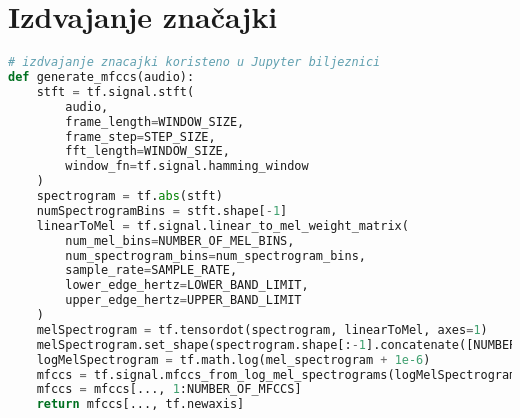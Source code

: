 \chapter{Izdvajanje značajki}
\label{add:mfcc}

\begin{lstlisting}[language=Python]
# izdvajanje znacajki koristeno u Jupyter biljeznici
def generate_mfccs(audio):
    stft = tf.signal.stft(
        audio,
        frame_length=WINDOW_SIZE,
        frame_step=STEP_SIZE,
        fft_length=WINDOW_SIZE,
        window_fn=tf.signal.hamming_window
    )
    spectrogram = tf.abs(stft)
    numSpectrogramBins = stft.shape[-1]
    linearToMel = tf.signal.linear_to_mel_weight_matrix(
        num_mel_bins=NUMBER_OF_MEL_BINS,
        num_spectrogram_bins=num_spectrogram_bins,
        sample_rate=SAMPLE_RATE,
        lower_edge_hertz=LOWER_BAND_LIMIT,
        upper_edge_hertz=UPPER_BAND_LIMIT
    )
    melSpectrogram = tf.tensordot(spectrogram, linearToMel, axes=1)
    melSpectrogram.set_shape(spectrogram.shape[:-1].concatenate([NUMBER_OF_MEL_BINS]))
    logMelSpectrogram = tf.math.log(mel_spectrogram + 1e-6)
    mfccs = tf.signal.mfccs_from_log_mel_spectrograms(logMelSpectrogram)
    mfccs = mfccs[..., 1:NUMBER_OF_MFCCS] 
    return mfccs[..., tf.newaxis]
\end{lstlisting}
